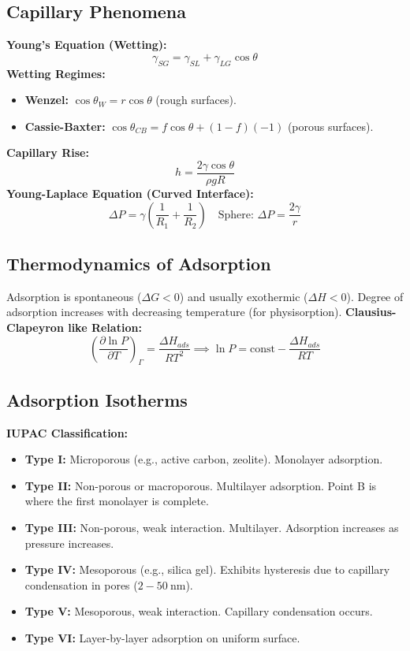 \subsection{Capillary Phenomena}
\textbf{Young's Equation (Wetting):}
\begin{equation}
    \gamma_{SG} = \gamma_{SL} + \gamma_{LG} \cos \theta
\end{equation}
\textbf{Wetting Regimes:}
\begin{itemize}
    \item \textbf{Wenzel:} $\cos \theta_{W} = r \cos \theta$ (rough surfaces).
    \item \textbf{Cassie-Baxter:} $\cos \theta_{CB} = f \cos \theta + (1-f)(-1)$ (porous surfaces).
\end{itemize}
\textbf{Capillary Rise:}
\begin{equation}
    h = \frac{2 \gamma \cos \theta}{\rho g R}
\end{equation}
\textbf{Young-Laplace Equation (Curved Interface):}
\begin{equation}
    \Delta P = \gamma \left( \frac{1}{R_1} + \frac{1}{R_2} \right) \quad \text{Sphere: } \Delta P = \frac{2\gamma}{r}
\end{equation}

\subsection{Thermodynamics of Adsorption}
Adsorption is spontaneous ($\Delta G < 0$) and usually exothermic ($\Delta H < 0$).
Degree of adsorption increases with decreasing temperature (for physisorption).
\textbf{Clausius-Clapeyron like Relation:}
\begin{equation}
    \left( \frac{\partial \ln P}{\partial T} \right)_{\Gamma} = \frac{\Delta H_{ads}}{RT^2} \implies \ln P = \text{const} - \frac{\Delta H_{ads}}{RT}
\end{equation}

\subsection{Adsorption Isotherms}
\textbf{IUPAC Classification:}
\begin{itemize}
    \item \textbf{Type I:} Microporous (e.g., active carbon, zeolite). Monolayer adsorption.
    \item \textbf{Type II:} Non-porous or macroporous. Multilayer adsorption. Point B is where the first monolayer is complete.
    \item \textbf{Type III:} Non-porous, weak interaction. Multilayer. Adsorption increases as pressure increases.
    \item \textbf{Type IV:} Mesoporous (e.g., silica gel). Exhibits hysteresis due to capillary condensation in pores ($2-\SI{50}{\nm}$).
    \item \textbf{Type V:} Mesoporous, weak interaction. Capillary condensation occurs.
    \item \textbf{Type VI:} Layer-by-layer adsorption on uniform surface.
\end{itemize}

